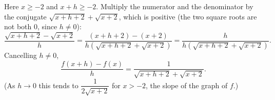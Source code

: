 Here $x\ge-2$ and $x+h\ge-2$. Multiply the numerator and the denominator by the conjugate $\sqrt{x+h+2}+\sqrt{x+2}$, which is positive (the two square roots are not both $0$, since $h\ne0$):
\[\dfrac{\sqrt{x+h+2}-\sqrt{x+2}}{h}=\dfrac{(x+h+2)-(x+2)}{h\left(\sqrt{x+h+2}+\sqrt{x+2}\right)}=\dfrac{h}{h\left(\sqrt{x+h+2}+\sqrt{x+2}\right)}.\]
Cancelling $h\ne0$,
\[\dfrac{f(x+h)-f(x)}{h}=\boxed{\dfrac{1}{\sqrt{x+h+2}+\sqrt{x+2}}}.\]
(As $h\to0$ this tends to $\dfrac{1}{2\sqrt{x+2}}$ for $x>-2$, the slope of the graph of $f$.)
